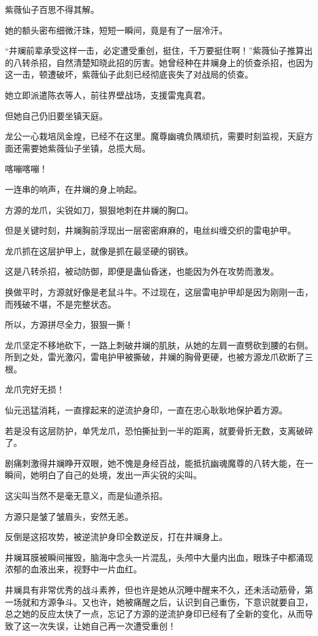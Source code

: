 \begin{this_body}
紫薇仙子百思不得其解。

她的额头密布细微汗珠，短短一瞬间，竟是有了一层冷汗。

“井斓前辈承受这样一击，必定遭受重创，挺住，千万要挺住啊！”紫薇仙子推算出的八转杀招，自然清楚知晓此招的厉害。她曾经种在井斓身上的侦查杀招，也因为这一击，顿遭破坏，紫薇仙子此刻已经彻底丧失了对战局的侦查。

她立即派遣陈衣等人，前往界壁战场，支援雷鬼真君。

但她自己仍旧要坐镇天庭。

龙公一心栽培凤金煌，已经不在这里。魔尊幽魂负隅顽抗，需要时刻监视，天庭方面还需要她紫薇仙子坐镇，总揽大局。

喀嘣喀嘣！

一连串的响声，在井斓的身上响起。

方源的龙爪，尖锐如刀，狠狠地刺在井斓的胸口。

但是关键时刻，井斓胸前浮现出一层密密麻麻的，电丝纠缠交织的雷电护甲。

龙爪抓在这层护甲上，就像是抓在最坚硬的钢铁。

这是八转杀招，被动防御，即便是蛊仙昏迷，也能因为外在攻势而激发。

换做平时，方源就好像是老鼠斗牛。不过现在，这层雷电护甲却是因为刚刚一击，而残破不堪，不是完整状态。

所以，方源拼尽全力，狠狠一撕！

龙爪坚定不移地砍下，一路上刺破井斓的肌肤，从她的左肩一直劈砍到腰的右侧。所到之处，雷光激闪，雷电护甲被撕破，井斓的胸骨更硬，也被方源龙爪砍断了三根。

龙爪完好无损！

仙元迅猛消耗，一直撑起来的逆流护身印，一直在忠心耿耿地保护着方源。

若是没有这层防护，单凭龙爪，恐怕撕扯到一半的距离，就要骨折无数，支离破碎了。

剧痛刺激得井斓睁开双眼，她不愧是身经百战，能抵抗幽魂魔尊的八转大能，在一瞬间，她明白了自己的处境，发出一声尖锐的尖叫。

这尖叫当然不是毫无意义，而是仙道杀招。

方源只是皱了皱眉头，安然无恙。

反倒是这招攻势，被逆流护身印全数逆反，打在井斓身上。

井斓耳膜被瞬间摧毁，脑海中念头一片混乱，头颅中大量内出血，眼珠子中都涌现浓郁的血液出来，视野中一片血红。

井斓具有非常优秀的战斗素养，但也许是她从沉睡中醒来不久，还未活动筋骨，第一场就和方源争斗。又也许，她被痛醒之后，认识到自己重伤，下意识就要自卫，总之她的反应太快了一点，忘记了方源的逆流护身印已经有了全新的变化，从而导致了这一次失误，让她自己再一次遭受重创！


\end{this_body}
